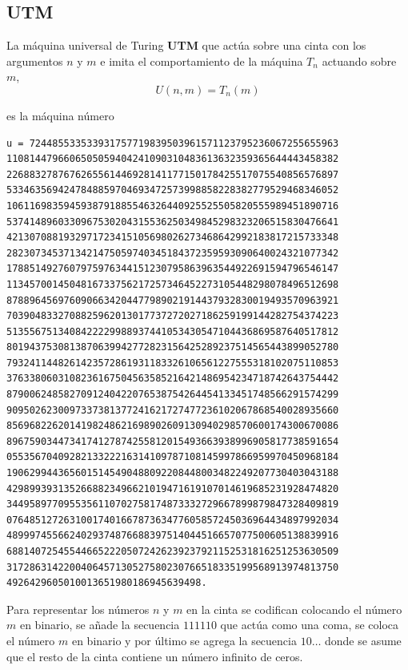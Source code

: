 \documentclass[10pt,a4paper]{article}
\begin{document}
\clearpage

\subsection{UTM}
La máquina universal de Turing \textbf{UTM} que actúa sobre una cinta con los argumentos $n$ y $m$ e imita el comportamiento de la máquina $T_n$ actuando sobre $m$,
\[
	U(n,m) = T_n(m)
\]

es la máquina número

\begin{lstlisting}
u = 724485533533931757719839503961571123795236067255655963
1108144796606505059404241090310483613632359365644443458382
2268832787676265561446928141177150178425517075540856576897
5334635694247848859704693472573998858228382779529468346052
1061169835945938791885546326440925525505820555989451890716
5374148960330967530204315536250349845298323206515830476641
4213070881932971723415105698026273468642992183817215733348
2823073453713421475059740345184372359593090640024321077342
1788514927607975976344151230795863963544922691594796546147
1134570014504816733756217257346452273105448298078496512698
8788964569760906634204477989021914437932830019493570963921
7039048332708825962013017737272027186259199144282754374223
5135567513408422229988937441053430547104436869587640517812
8019437530813870639942772823156425289237514565443899052780
7932411448261423572861931183326106561227555318102075110853
3763380603108236167504563585216421486954234718742643754442
8790062485827091240422076538754264454133451748566291574299
9095026230097337381377241621727477236102067868540028935660
8569682262014198248621698902609130940298570600174300670086
8967590344734174127874255812015493663938996905817738591654
0553567040928213322216314109787108145997866959970450968184
1906299443656015145490488092208448003482249207730403043188
4298993931352668823496621019471619107014619685231928474820
3449589770955356110702758174873332729667899879847328409819
0764851272631001740166787363477605857245036964434897992034
4899974556624029374876688397514044516657077500605138839916
6881407254554466522205072426239237921152531816251253630509
3172863142200406457130527580230766518335199568913974813750
4926429605010013651980186945639498.
\end{lstlisting}

Para representar los números $n$ y $m$ en la cinta se codifican colocando el número $m$ en binario, se añade la secuencia $111110$ que actúa como una coma, se coloca el número $m$ en binario y por último se agrega la secuencia $10\dots$ donde se asume que el resto de la cinta contiene un número infinito de ceros.
\end{document}
